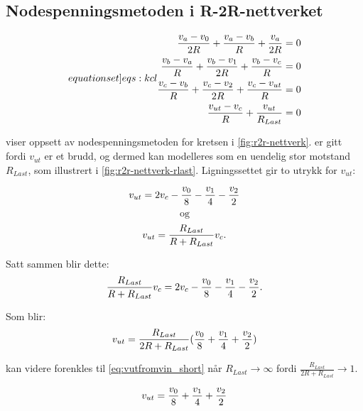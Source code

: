 \documentclass[11pt,a4paper,twocolumn]{article}
\begin{document}
\subsection{Nodespenningsmetoden i R-2R-nettverket}

\begin{subequations}
\label[equationset]{eqs:kcl}

\begin{align}
\frac{v_a-v_0}{2R}+\frac{v_a-v_b}{R}+\frac{v_a}{2R} = 0 \label{eqs:kcl:1} \\
\frac{v_b-v_a}{R} + \frac{v_b-v_1}{2R}+\frac{v_b-v_c}{R} = 0 \label{eqs:kcl:2} \\
\frac{v_c-v_b}{R} + \frac{v_c-v_2}{2R} + \frac{v_c-v_{ut}}{R} = 0 \label{eqs:kcl:3} \\
\frac{v_{ut}-v_c}{R} + \frac{v_{ut}}{R_{Last}} = 0 \label{eqs:kcl:4}
\end{align}
\end{subequations}

 viser oppsett av nodespenningsmetoden for kretsen i \cref{fig:r2r-nettverk}.  er gitt fordi $v_{ut}$ er et brudd, og dermed kan modelleres som en uendelig stor motstand $R_{Last}$, som illustrert i \cref{fig:r2r-nettverk-rlast}. Ligningssettet gir to utrykk for $v_{ut}$:

$$
v_{ut} = 2v_c - \frac{v_0}{8} - \frac{v_1}{4} - \frac{v_2}{2} \\
$$
$$\text{og}$$
$$
v_{ut} = \frac{R_{Last}}{R + R_{Last}}v_c.\\
$$

Satt sammen blir dette:
\[
\frac{R_{Last}}{R + R_{Last}}v_c = 2v_c - \frac{v_0}{8} - \frac{v_1}{4} - \frac{v_2}{2}\\.
\]

Som blir:
\begin{equation}
v_{ut} = \frac{R_{Last}}{2R + R_{Last}}(\frac{v_0}{8} + \frac{v_1}{4} + \frac{v_2}{2})\\
\label{eq:vutfromvin_full}
\end{equation}

 kan videre forenkles til \cref{eq:vutfromvin_short} når $R_{Last} \to \infty$ fordi $\frac{R_{Last}}{2R + R_{Last}} \to 1$.

\begin{equation}
v_{ut} = \frac{v_0}{8} + \frac{v_1}{4} + \frac{v_2}{2}\\
\label{eq:vutfromvin_short}
\end{equation}
\end{document}
